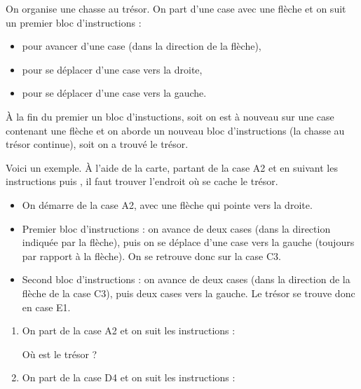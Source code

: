 \documentclass[class=report,crop=false, 12pt]{standalone}
\begin{document}
\begin{activite}
On organise une chasse au trésor. 
On part d'une case avec une flèche et on suit un premier bloc d'instructions :
\begin{itemize}
  \item {} pour avancer d'une case (dans la direction de la flèche), 
  \item {} pour se déplacer d'une case vers la droite,
  \item {} pour se déplacer d'une case vers la gauche.
\end{itemize}
À la fin du premier un bloc d'instuctions, soit on est à nouveau sur une case contenant une flèche et on aborde un nouveau bloc d'instructions (la chasse au trésor continue), soit on a trouvé le trésor.

Voici un exemple. À l'aide de la carte, partant de la case A2 et en suivant les instructions  puis , il faut trouver l'endroit où se cache le trésor. 

\begin{itemize}
  \item On démarre de la case A2, avec une flèche qui pointe vers la droite.
  \item Premier bloc d'instructions  : on avance de deux cases (dans la direction indiquée par la flèche), puis on se déplace d'une case vers la gauche (toujours par rapport à la flèche). On se retrouve donc sur la case C3.
  \item Second bloc d'instructions  : on avance de deux cases (dans la direction de la flèche de la case C3), puis deux cases vers la gauche. Le trésor se trouve donc en case E1. 
\end{itemize}



\begin{enumerate}
  \item On part de la case A2 et on suit les instructions :

\centerline{}  

Où est le trésor ?
  
  
  \item On part de la case D4 et on suit les instructions :

\centerline{}  


\end{enumerate}
\end{activite}
\end{document}
